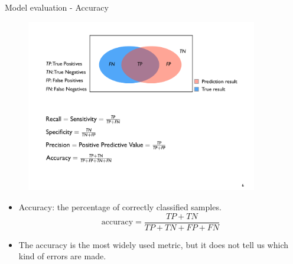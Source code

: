 \documentclass[xcolor=pdftex,dvipsnames,table]{beamer}
\begin{document}
\begin{frame}{Model evaluation - Accuracy}
	\begin{figure}[htb]
		\includegraphics[width=0.9\textwidth]{../graphics/ModelEvaluation.pdf}
	\end{figure}
	\begin{itemize}		
		\item Accuracy: the percentage of correctly classified samples. 
		\begin{equation}
			\text{accuracy} = \frac{TP + TN}{TP + TN + FP + FN}
		\end{equation}
		\item The accuracy is the most widely used metric, but it does not tell us which kind of errors are made. 
	\end{itemize}
\end{frame}
\end{document}
